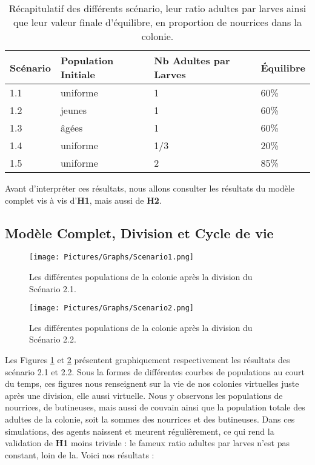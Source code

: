 	\begin{table}
		\centering
		\begin{tabular}{l|l|l|l}
    	Scénario & Population Initiale & Nb Adultes par Larves & Équilibre \\
   		\hline
   		1.1 & uniforme & 1 & 60\% \\
   		1.2 & jeunes & 1 & 60\% \\
   		1.3 & âgées & 1 & 60\% \\
   		1.4 & uniforme & 1/3 & 20\% \\
   		1.5 & uniforme & 2 & 85\% \\
		\end{tabular}	
		\caption{Récapitulatif des différents scénario, leur ratio adultes par larves ainsi que leur valeur finale d'équilibre, en proportion de nourrices dans la colonie.}	
   		\label{TabEnvConstant}
	\end{table}	
	
	Avant d'interpréter ces résultats, nous allons consulter les résultats du modèle complet vis à vis d'\textbf{H1}, mais aussi de \textbf{H2}.
	
	\subsection{Modèle Complet, Division et Cycle de vie}
	
	\begin{figure}
	\centering
	\texttt{[image: Pictures/Graphs/Scenario1.png]}
	\caption{Les différentes populations de la colonie après la division du Scénario 2.1.}
	\label{sc1}
	\end{figure}
	
	\begin{figure}
	\centering
	\texttt{[image: Pictures/Graphs/Scenario2.png]}
	\caption{Les différentes populations de la colonie après la division du Scénario 2.2.}
	\label{sc2}
	\end{figure}
	
	
	Les Figures \ref{sc1} et \ref{sc2} présentent graphiquement respectivement les résultats des scénario 2.1 et 2.2. Sous la formes de différentes courbes de populations au court du temps, ces figures nous renseignent sur la vie de nos colonies virtuelles juste après une division, elle aussi virtuelle. Nous y observons les populations de nourrices, de butineuses, mais aussi de couvain ainsi que la population totale des adultes de la colonie, soit la sommes des nourrices et des butineuses. Dans ces simulations, des agents naissent et meurent régulièrement, ce qui rend la validation de \textbf{H1} moins triviale : le fameux ratio adultes par larves n'est pas constant, loin de la. Voici nos résultats :
		
